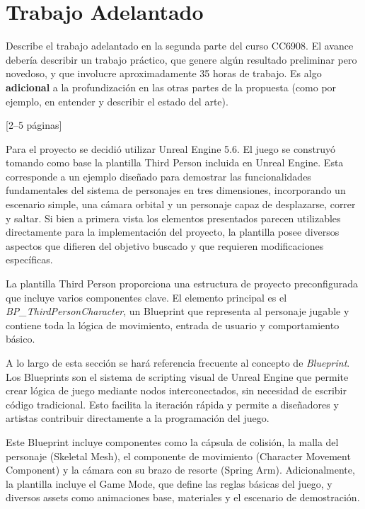 \documentclass[informe]{upropuesta}
\begin{document}
\section{Trabajo Adelantado}\label{sec:tra}









\begin{pauta}
Describe el trabajo adelantado en la segunda parte del curso CC6908. El avance debería describir un trabajo práctico, que genere algún resultado preliminar pero novedoso, y que involucre aproximadamente 35 horas de trabajo. Es algo \textbf{adicional} a la profundización en las otras partes de la propuesta (como por ejemplo, en entender y describir el estado del arte).

[2--5 páginas]




\end{pauta}



Para el proyecto se decidió utilizar Unreal Engine 5.6. El juego se construyó tomando como base la plantilla Third Person incluida en Unreal Engine. Esta corresponde a un ejemplo diseñado para demostrar las funcionalidades fundamentales del sistema de personajes en tres dimensiones, incorporando un escenario simple, una cámara orbital y un personaje capaz de desplazarse, correr y saltar. Si bien a primera vista los elementos presentados parecen utilizables directamente para la implementación del proyecto, la plantilla posee diversos aspectos que difieren del objetivo buscado y que requieren modificaciones específicas.

La plantilla Third Person proporciona una estructura de proyecto preconfigurada que incluye varios componentes clave. El elemento principal es el \textit{BP\_ThirdPersonCharacter}, un Blueprint que representa al personaje jugable y contiene toda la lógica de movimiento, entrada de usuario y comportamiento básico. 

A lo largo de esta sección se hará referencia frecuente al concepto de \textit{Blueprint}. Los Blueprints son el sistema de scripting visual de Unreal Engine que permite crear lógica de juego mediante nodos interconectados, sin necesidad de escribir código tradicional. Esto facilita la iteración rápida y permite a diseñadores y artistas contribuir directamente a la programación del juego. 

Este Blueprint incluye componentes como la cápsula de colisión, la malla del personaje (Skeletal Mesh), el componente de movimiento (Character Movement Component) y la cámara con su brazo de resorte (Spring Arm). Adicionalmente, la plantilla incluye el Game Mode, que define las reglas básicas del juego, y diversos assets como animaciones base, materiales y el escenario de demostración.
\end{document}
